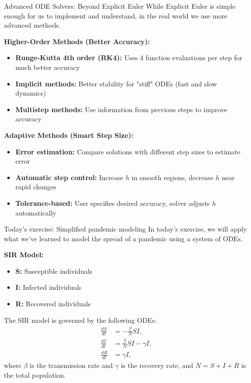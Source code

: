 \documentclass{beamer}
\begin{document}
\begin{frame}{Advanced ODE Solvers: Beyond Explicit Euler}
  While Explicit Euler is simple enough for us to implement and understand, in the real world we use more advanced methods.
  
  \vspace{0.5em}
  \textbf{Higher-Order Methods (Better Accuracy):}
  \begin{itemize}
    \item \textbf{Runge-Kutta 4th order (RK4):} Uses 4 function evaluations per step for much better accuracy
    \item \textbf{Implicit methods:} Better stability for "stiff" ODEs (fast and slow dynamics)
    \item \textbf{Multistep methods:} Use information from previous steps to improve accuracy
  \end{itemize}
  
  \vspace{0.5em}
  \textbf{Adaptive Methods (Smart Step Size):}
  \begin{itemize}
    \item \textbf{Error estimation:} Compare solutions with different step sizes to estimate error
    \item \textbf{Automatic step control:} Increase $h$ in smooth regions, decrease $h$ near rapid changes
    \item \textbf{Tolerance-based:} User specifies desired accuracy, solver adjusts $h$ automatically
  \end{itemize}

\end{frame}

\begin{frame}{Today's exercise: Simplified pandemic modeling}
  In today's exercise, we will apply what we've learned to model the spread of a pandemic using a system of ODEs.
  
  \vspace{0.5em}
  \textbf{SIR Model:}
  \begin{itemize}
    \item \textbf{S:} Susceptible individuals
    \item \textbf{I:} Infected individuals
    \item \textbf{R:} Recovered individuals
  \end{itemize}
  
  \vspace{0.5em}
  The SIR model is governed by the following ODEs:
  \[
    \begin{aligned}
      \frac{dS}{dt} &= -\frac{\beta}{N} S I, \\
      \frac{dI}{dt} &= \frac{\beta}{N} S I - \gamma I, \\
      \frac{dR}{dt} &= \gamma I,
    \end{aligned}
  \]
  where $\beta$ is the transmission rate and $\gamma$ is the recovery rate, and \(N = S + I + R\) is the total population.

\end{frame}
\end{document}
